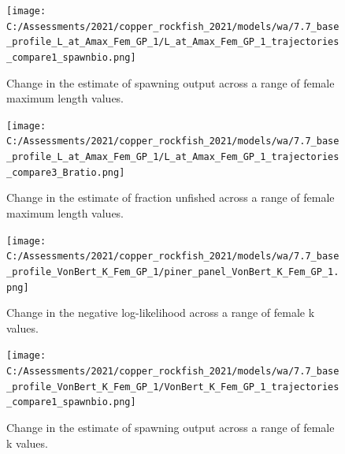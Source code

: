\documentclass[11pt,
  english,
  a4paper,
]{article}
\begin{document}
\tagmcend\tagstructend


\begin{figure}
\centering
\texttt{[image: C:/Assessments/2021/copper\_rockfish\_2021/models/wa/7.7\_base\_profile\_L\_at\_Amax\_Fem\_GP\_1/L\_at\_Amax\_Fem\_GP\_1\_trajectories\_compare1\_spawnbio.png]}
\caption{Change in the estimate of spawning output across a range of female maximum length values.\label{fig:linf-ssb}}
\end{figure}

\tagmcend\tagstructend


\begin{figure}
\centering
\texttt{[image: C:/Assessments/2021/copper\_rockfish\_2021/models/wa/7.7\_base\_profile\_L\_at\_Amax\_Fem\_GP\_1/L\_at\_Amax\_Fem\_GP\_1\_trajectories\_compare3\_Bratio.png]}
\caption{Change in the estimate of fraction unfished across a range of female maximum length values.\label{fig:linf-depl}}
\end{figure}

\tagmcend\tagstructend


\begin{figure}
\centering
\texttt{[image: C:/Assessments/2021/copper\_rockfish\_2021/models/wa/7.7\_base\_profile\_VonBert\_K\_Fem\_GP\_1/piner\_panel\_VonBert\_K\_Fem\_GP\_1.png]}
\caption{Change in the negative log-likelihood across a range of female k values.\label{fig:k-profile}}
\end{figure}

\tagmcend\tagstructend


\begin{figure}
\centering
\texttt{[image: C:/Assessments/2021/copper\_rockfish\_2021/models/wa/7.7\_base\_profile\_VonBert\_K\_Fem\_GP\_1/VonBert\_K\_Fem\_GP\_1\_trajectories\_compare1\_spawnbio.png]}
\caption{Change in the estimate of spawning output across a range of female k values.\label{fig:k-ssb}}
\end{figure}

\tagmcend\tagstructend

\end{document}
